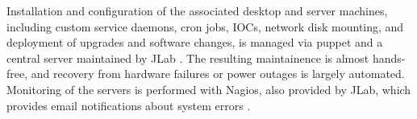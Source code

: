 Installation and configuration of the associated desktop and server machines, including custom service daemons, cron jobs, IOCs, network disk mounting, and deployment of upgrades and software changes, is managed via puppet and a central server maintained by JLab \cite{puppet-website}. The resulting maintainence is almost hands-free, and recovery from hardware failures or power outages is largely automated.  Monitoring of the servers is performed with Nagios, also provided by JLab, which provides email notifications about system errors \cite{nagios-website}.

